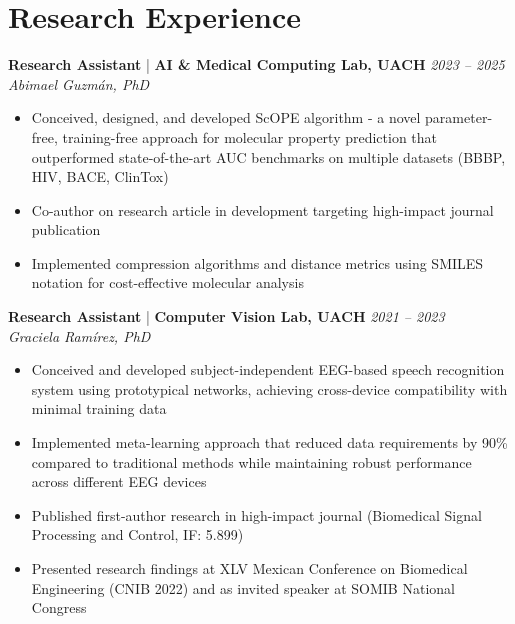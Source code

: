 \section*{Research Experience}


\textbf{Research Assistant} | \textbf{AI \& Medical Computing Lab, UACH} 
\hfill {
   \textit{
   \color{lightgray}
   2023 -- 2025
   }
} \\
\textit{
   \color{mediumgray}
   Abimael Guzmán, PhD
}

\begin{itemize}
   \item Conceived, designed, and developed ScOPE algorithm - a novel parameter-free, training-free approach for molecular property prediction that outperformed state-of-the-art AUC benchmarks on multiple datasets (BBBP, HIV, BACE, ClinTox)
   \item Co-author on research article in development targeting high-impact journal publication
   \item Implemented compression algorithms and distance metrics using SMILES notation for cost-effective molecular analysis
\end{itemize}
\textbf{Research Assistant} | \textbf{Computer Vision Lab, UACH} 
\hfill {
   \textit{
   \color{lightgray}
   2021 -- 2023
   }
} \\
\textit{
   \color{mediumgray}
   Graciela Ramírez, PhD
}
\begin{itemize}
   \item Conceived and developed subject-independent EEG-based speech recognition system using prototypical networks, achieving cross-device compatibility with minimal training data
   \item Implemented meta-learning approach that reduced data requirements by 90\% compared to traditional methods while maintaining robust performance across different EEG devices
   \item Published first-author research in high-impact journal (Biomedical Signal Processing and Control, IF: 5.899)
   \item Presented research findings at XLV Mexican Conference on Biomedical Engineering (CNIB 2022) and as invited speaker at SOMIB National Congress
\end{itemize}


